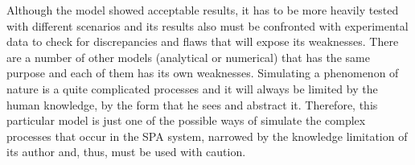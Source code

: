 Although the model showed acceptable results, it has to be more heavily tested with different scenarios and its results also must be confronted with experimental data to check for discrepancies and flaws that will expose its weaknesses.
There are a number of other models (analytical or numerical) that has the same purpose and each of them has its own weaknesses.
Simulating a phenomenon of nature is a quite complicated processes and it will always be limited by the human knowledge, by the form that he sees and abstract it.
Therefore, this particular model is just one of the possible ways of simulate the complex processes that occur in the SPA system, narrowed by the knowledge limitation of its author and, thus, must be used with caution.

% 
%
%
%




